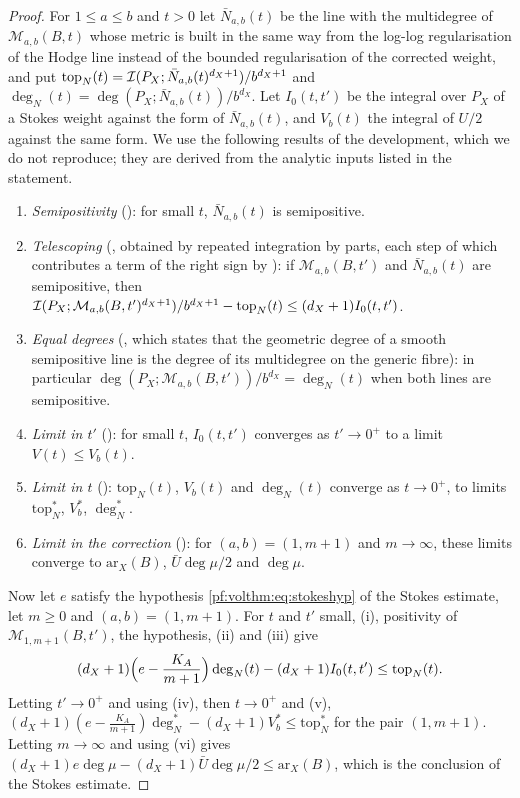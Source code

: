 \begin{proof}
For $1\le a\le b$ and $t>0$ let $\bar N_{a,b}(t)$ be the line with the multidegree of $\mathcal M_{a,b}(B,t)$ whose metric
is built in the same way from the log-log regularisation of the Hodge line instead of the bounded regularisation of
the corrected weight, and put $\mathrm{top}_N(t)=\mathcal{I}(P_X;\bar N_{a,b}(t)^{d_X+1})/b^{d_X+1}$ and
$\deg_N(t)=\deg(P_X;\bar N_{a,b}(t))/b^{d_X}$. Let $I_0(t,t')$ be the integral over $P_X$ of a Stokes weight
against the form of $\bar N_{a,b}(t)$, and $V_b(t)$ the integral of $U/2$ against the same form. We use the following
results of the development, which we do not reproduce; they are derived from the analytic inputs listed in the
statement.
\begin{enumerate}[label=(\roman*)]
\item \emph{Semipositivity} (): for small $t$,
$\bar N_{a,b}(t)$ is semipositive.
\item \emph{Telescoping} (, obtained by
repeated integration by parts, each step of which contributes a term of the right sign by
): if $\mathcal M_{a,b}(B,t')$ and
$\bar N_{a,b}(t)$ are semipositive, then
$\mathcal{I}(P_X;\mathcal M_{a,b}(B,t')^{d_X+1})/b^{d_X+1}-\mathrm{top}_N(t)\le(d_X+1)I_0(t,t')$.
\item \emph{Equal degrees} (, which states that the
geometric degree of a smooth semipositive line is the degree of its multidegree on the generic fibre): in
particular $\deg(P_X;\mathcal M_{a,b}(B,t'))/b^{d_X}=\deg_N(t)$ when both lines are semipositive.
\item \emph{Limit in $t'$} (): for small $t$,
$I_0(t,t')$ converges as $t'\to0^+$ to a limit $V(t)\le V_b(t)$.
\item \emph{Limit in $t$} ():
$\mathrm{top}_N(t)$, $V_b(t)$ and $\deg_N(t)$ converge as $t\to0^+$, to limits $\mathrm{top}_N^*$, $V_b^*$, $\deg_N^*$.
\item \emph{Limit in the correction} ():
for $(a,b)=(1,m+1)$ and $m\to\infty$, these limits converge to $\mathrm{ar}_X(B)$, $\bar U\deg\mu/2$ and $\deg\mu$.
\end{enumerate}
Now let $e$ satisfy the hypothesis \eqref{pf:volthm:eq:stokeshyp} of the Stokes estimate, let $m\ge0$ and $(a,b)=(1,m+1)$.
For $t$ and $t'$ small, (i), positivity of $\mathcal M_{1,m+1}(B,t')$, the hypothesis, (ii) and (iii) give
\[
(d_X+1)\Bigl(e-\frac{K_A}{m+1}\Bigr)\deg_N(t)-(d_X+1)I_0(t,t')\le\mathrm{top}_N(t).
\]
Letting $t'\to0^+$ and using (iv), then $t\to0^+$ and (v),
$(d_X+1)(e-\frac{K_A}{m+1})\deg_N^*-(d_X+1)V_b^*\le\mathrm{top}_N^*$ for the pair $(1,m+1)$. Letting $m\to\infty$ and
using (vi) gives $(d_X+1)e\deg\mu-(d_X+1)\bar U\deg\mu/2\le\mathrm{ar}_X(B)$, which is the conclusion of the Stokes
estimate.
\end{proof}

